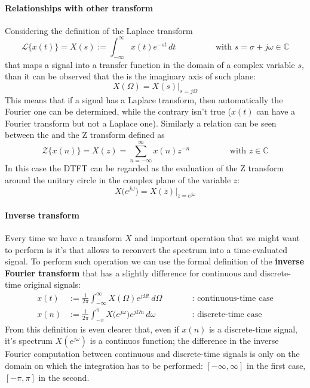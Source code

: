 	\paragraph{Relationships with other transform} Considering the definition of the Laplace transform
	\[ \mathscr L \big\{ x(t) \} = X(s) := \int_{-\infty}^\infty x(t) e^{-st}\, dt \hspace{2cm} \textrm{with } s = \sigma + j\omega \in \mathds C \]
	that maps a signal into a transfer function in the domain of a complex variable $s$, than it can be observed that the \ctft is the imaginary axis of such plane:
	\[ X(\Omega) = X(s)\Big|_{s=j\Omega} \]
	This means that if a signal has a Laplace transform, then automatically the Fourier one can be determined, while the contrary isn't true  ($x(t)$ can have a Fourier transform but not a Laplace one). Similarly a relation can be seen between the \dtft and the Z transform defined as
	\[ \mathscr Z  \big\{x(n)\big\} = X(z) = \sum_{n=-\infty}^{\infty} x(n) z^{-n}  \hspace{2cm} \textrm{with } z \in \mathds C \]
	In this case the DTFT can be regarded as the evaluation of the Z transform around the unitary circle in the complex plane of the variable $z$:
	\[ X\big(e^{j\omega}\big) = X(z) \Big|_{z=e^{j\omega}}\]
	
	\paragraph{Inverse transform} Every time we have a transform $X$ and important operation that we might want to perform is it's  that allows to reconvert the spectrum into a time-evaluated signal. To perform such operation we can use the formal definition of the \textbf{inverse Fourier transform} that has a slightly difference for continuous and discrete-time original signals:
	\begin{equation} \label{eq:four:inversetransform}
	\begin{aligned}
		x(t) & := \frac 1 {2\pi} \int_{-\infty}^\infty X(\Omega) e^{j\Omega t}\, d\Omega \qquad && \textrm{: continuous-time case} \\
		x(n) & := \frac 1 {2\pi} \int_{-\pi}^\pi X\big(e^{j\omega}\big) e^{j\Omega n}\, d\omega && \textrm{: discrete-time case} 
	\end{aligned}
	\end{equation}
	From this definition is even clearer that, even if $x(n)$ is a discrete-time signal, it's spectrum $X(e^{j\omega})$ is a continuos function; the difference in the inverse Fourier computation between continuous and discrete-time signals is only on the domain on which the integration has to be performed: $[-\infty,\infty]$ in the first case, $[-\pi,\pi]$ in the second.
	
